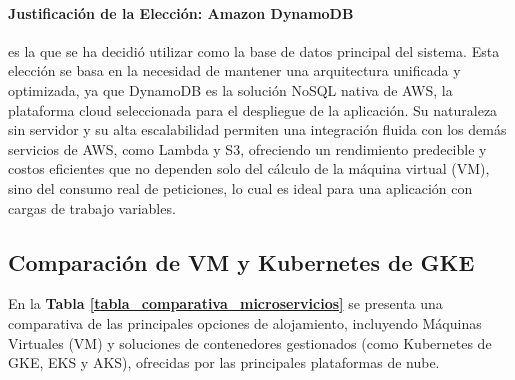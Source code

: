 \paragraph{Justificación de la Elección: Amazon DynamoDB}
es la que se ha decidió utilizar como la base de datos principal del sistema. Esta elección se basa en la necesidad de mantener una arquitectura unificada y optimizada, ya que DynamoDB es la solución NoSQL nativa de AWS, la plataforma cloud seleccionada para el despliegue de la aplicación. Su naturaleza sin servidor y su alta escalabilidad permiten una integración fluida con los demás servicios de AWS, como Lambda y S3, ofreciendo un rendimiento predecible y costos eficientes que no dependen solo del cálculo de la máquina virtual (VM), sino del consumo real de peticiones, lo cual es ideal para una aplicación con cargas de trabajo variables.

\subsection{Comparación de VM y Kubernetes de GKE}

En la \textbf{Tabla \ref{tabla_comparativa_microservicios}} se presenta una comparativa de las principales opciones de alojamiento, incluyendo Máquinas Virtuales (VM) y soluciones de contenedores gestionados (como Kubernetes de GKE, EKS y AKS), ofrecidas por las principales plataformas de nube.

